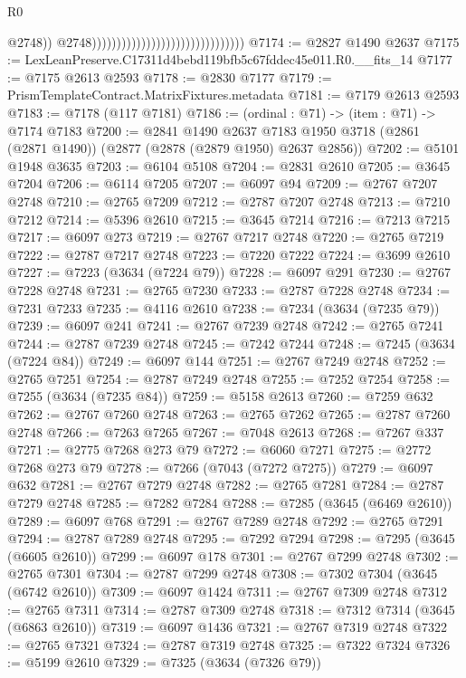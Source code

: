 \begin{lexlean}{R0}
\begin{coremodule}
                                                                      @2748))
                                                                  @2748)))))))))))))))))))))))))))))))
@7174 := @2827 @1490 @2637
@7175 := LexLeanPreserve.C17311d4bebd119bfb5c67fddec45e011.R0.__fits_14
@7177 := @7175 @2613 @2593
@7178 := @2830 @7177
@7179 := PrismTemplateContract.MatrixFixtures.metadata
@7181 := @7179 @2613 @2593
@7183 := @7178 (@117 @7181)
@7186 := (ordinal : @71) -> (item : @71) -> @7174 @7183
@7200 := @2841
    @1490
    @2637
    @7183
    @1950
    @3718
    (@2861 (@2871 @1490))
    (@2877 (@2878 (@2879 @1950) @2637 @2856))
@7202 := @5101 @1948 @3635
@7203 := @6104 @5108
@7204 := @2831 @2610
@7205 := @3645 @7204
@7206 := @6114 @7205
@7207 := @6097 @94
@7209 := @2767 @7207 @2748
@7210 := @2765 @7209
@7212 := @2787 @7207 @2748
@7213 := @7210 @7212
@7214 := @5396 @2610
@7215 := @3645 @7214
@7216 := @7213 @7215
@7217 := @6097 @273
@7219 := @2767 @7217 @2748
@7220 := @2765 @7219
@7222 := @2787 @7217 @2748
@7223 := @7220 @7222
@7224 := @3699 @2610
@7227 := @7223 (@3634 (@7224 @79))
@7228 := @6097 @291
@7230 := @2767 @7228 @2748
@7231 := @2765 @7230
@7233 := @2787 @7228 @2748
@7234 := @7231 @7233
@7235 := @4116 @2610
@7238 := @7234 (@3634 (@7235 @79))
@7239 := @6097 @241
@7241 := @2767 @7239 @2748
@7242 := @2765 @7241
@7244 := @2787 @7239 @2748
@7245 := @7242 @7244
@7248 := @7245 (@3634 (@7224 @84))
@7249 := @6097 @144
@7251 := @2767 @7249 @2748
@7252 := @2765 @7251
@7254 := @2787 @7249 @2748
@7255 := @7252 @7254
@7258 := @7255 (@3634 (@7235 @84))
@7259 := @5158 @2613
@7260 := @7259 @632
@7262 := @2767 @7260 @2748
@7263 := @2765 @7262
@7265 := @2787 @7260 @2748
@7266 := @7263 @7265
@7267 := @7048 @2613
@7268 := @7267 @337
@7271 := @2775 @7268 @273 @79
@7272 := @6060 @7271
@7275 := @2772 @7268 @273 @79
@7278 := @7266 (@7043 (@7272 @7275))
@7279 := @6097 @632
@7281 := @2767 @7279 @2748
@7282 := @2765 @7281
@7284 := @2787 @7279 @2748
@7285 := @7282 @7284
@7288 := @7285 (@3645 (@6469 @2610))
@7289 := @6097 @768
@7291 := @2767 @7289 @2748
@7292 := @2765 @7291
@7294 := @2787 @7289 @2748
@7295 := @7292 @7294
@7298 := @7295 (@3645 (@6605 @2610))
@7299 := @6097 @178
@7301 := @2767 @7299 @2748
@7302 := @2765 @7301
@7304 := @2787 @7299 @2748
@7308 := @7302 @7304 (@3645 (@6742 @2610))
@7309 := @6097 @1424
@7311 := @2767 @7309 @2748
@7312 := @2765 @7311
@7314 := @2787 @7309 @2748
@7318 := @7312 @7314 (@3645 (@6863 @2610))
@7319 := @6097 @1436
@7321 := @2767 @7319 @2748
@7322 := @2765 @7321
@7324 := @2787 @7319 @2748
@7325 := @7322 @7324
@7326 := @5199 @2610
@7329 := @7325 (@3634 (@7326 @79))

\end{coremodule}
\end{lexlean}
